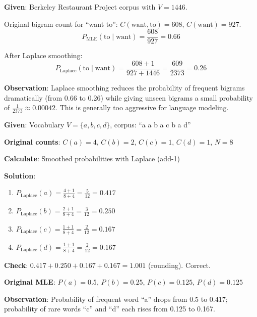 \documentclass[11pt,a4paper]{article}
\begin{document}
\begin{tcolorbox}[colback=green!5!white,colframe=green!75!black,title=\textbf{Worked Example 8: Laplace Smoothing on a Bigram}]
\textbf{Given}: Berkeley Restaurant Project corpus with $V = 1446$.

Original bigram count for ``want to'': $C(\text{want}, \text{to}) = 608$, $C(\text{want}) = 927$.
\[
P_{\text{MLE}}(\text{to} \mid \text{want}) = \frac{608}{927} = 0.66
\]

After Laplace smoothing:
\[
P_{\text{Laplace}}(\text{to} \mid \text{want}) = \frac{608 + 1}{927 + 1446} = \frac{609}{2373} = 0.26
\]

\textbf{Observation}: Laplace smoothing reduces the probability of frequent bigrams dramatically (from 0.66 to 0.26) while giving unseen bigrams a small probability of $\frac{1}{2373} \approx 0.00042$. This is generally too aggressive for language modeling.
\end{tcolorbox}

\begin{tcolorbox}[colback=green!5!white,colframe=green!75!black,title=\textbf{Worked Example 9: Laplace Smoothing on Unigrams}]
\textbf{Given}: Vocabulary $V = \{a, b, c, d\}$, corpus: ``a a b a c b a d''

\textbf{Original counts}: $C(a) = 4$, $C(b) = 2$, $C(c) = 1$, $C(d) = 1$, $N = 8$

\textbf{Calculate}: Smoothed probabilities with Laplace (add-1)

\textbf{Solution}:
\begin{enumerate}
    \item $P_{\text{Laplace}}(a) = \frac{4+1}{8+4} = \frac{5}{12} = 0.417$
    \item $P_{\text{Laplace}}(b) = \frac{2+1}{8+4} = \frac{3}{12} = 0.250$
    \item $P_{\text{Laplace}}(c) = \frac{1+1}{8+4} = \frac{2}{12} = 0.167$
    \item $P_{\text{Laplace}}(d) = \frac{1+1}{8+4} = \frac{2}{12} = 0.167$
\end{enumerate}

\textbf{Check}: $0.417 + 0.250 + 0.167 + 0.167 = 1.001$ (rounding). Correct.

\textbf{Original MLE}: $P(a) = 0.5$, $P(b) = 0.25$, $P(c) = 0.125$, $P(d) = 0.125$

\textbf{Observation}: Probability of frequent word ``a'' drops from 0.5 to 0.417; probability of rare words ``c'' and ``d'' each rises from 0.125 to 0.167.
\end{tcolorbox}
\end{document}
